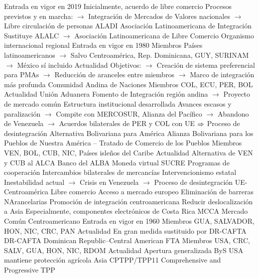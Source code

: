 \documentclass{nuevotema}
\begin{document}
\begin{esquemal}
				\4[] Entrada en vigor en 2019
				\4[] Inicialmente, acuerdo de libre comercio
				\4[] Procesos previstos y en marcha:
				\4[] $\to$ Integración de Mercados de Valores nacionales
				\4[] $\to$ Libre circulación de personas
			\3 ALADI
				\4 Asociación Latinoamericana de Integración
				\4[] Sustituye ALALC
				\4[] $\to$ Asociación Latinoamericana de Libre Comercio
				\4[] Organismo internacional regional
				\4 Entrada en vigor en 1980
				\4 Miembros
				\4[] Países latinoamericanos
				\4[] $\to$ Salvo Centroamérica, Rep. Dominicana, GUY, SURINAM
				\4[] $\to$ México sí incluido
				\4 Actualidad
				\4[] Objetivos:
				\4[] $\to$ Creación de sistema preferencial para PMAs
				\4[] $\to$ Reducción de aranceles entre miembros
				\4[] $\to$ Marco de integración más profunda
			\3 Comunidad Andina de Naciones
				\4 Miembros
				\4[] COL, ECU, PER, BOL
				\4 Actualidad
				\4[] Unión Aduanera
				\4[] Fomento de Integración región andina
				\4[] $\to$ Proyecto de mercado común
				\4[] Estructura institucional desarrollada
				\4[] Avances escasos y paralización
				\4[] $\to$ Compite con MERCOSUR, Alianza del Pacífico
				\4[] $\to$ Abandono de Venezuela
				\4[] $\to$ Acuerdos bilaterales de PER y COL con UE
				\4[] $\Rightarrow$ Proceso de desintegración
			\3 Alternativa Bolivariana para América
				\4 Alianza Bolivariana para los Pueblos de Nuestra América -- Tratado de Comercio de los Pueblos
				\4 Miembros
				\4[] VEN, BOL, CUB, NIC, Países isleños del Caribe
				\4 Actualidad
				\4[] Alternativa de VEN y CUB al ALCA
				\4[] Banco del ALBA
				\4[] Moneda virtual SUCRE
				\4[] Programas de cooperación
				\4[] Intercambios bilaterales de mercancías
				\4[] Intervencionismo estatal
				\4[] Inestabilidad actual
				\4[] $\to$ Crisis en Venezuela
				\4[] $\to$ Proceso de desintegración
			\3 UE-Centroamérica
				\4 Libre comercio
				\4[] Acceso a mercado europeo
				\4[] Eliminación de barreras NArancelarias
				\4 Promoción de integración centroamericana
				\4 Reducir deslocalización a Asia
				\4[] Especialmente, componentes electrónicos de Costa Rica
			\3 MCCA
				\4 Mercado Común Centroamericano
				\4 Entrada en vigor en 1960
				\4 Miembros
				\4[] GUA, SALVADOR, HON, NIC, CRC, PAN
				\4 Actualidad
				\4[] En gran medida sustituido por DR-CAFTA
			\3 DR-CAFTA
				\4 Dominican Republic--Central American FTA
				\4 Miembros
				\4[] USA, CRC, SALV, GUA, HON, NIC, RDOM
				\4 Actualidad
				\4[] Apertura generalizada ByS
				\4[] USA mantiene protección agrícola
		\2 Asia
			\3 CPTPP/TPP11
				\4 Comprehensive and Progressive TPP

\end{esquemal}
\end{document}
